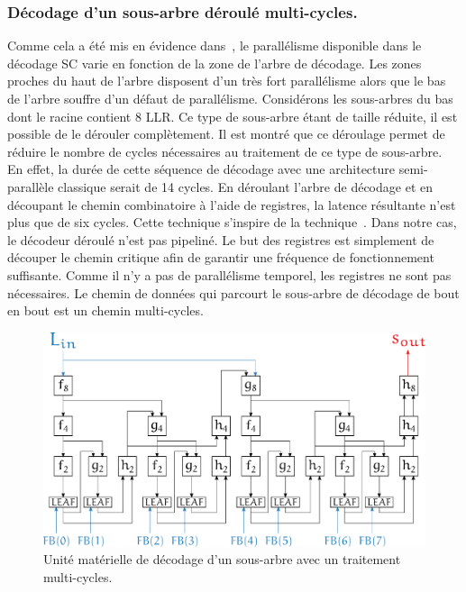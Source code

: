 \subsubsection{Décodage d'un sous-arbre déroulé multi-cycles.}

Comme cela a été mis en évidence dans~\cite{gal_scalable_2016}, le parallélisme disponible dans le décodage SC varie en fonction de la zone de l'arbre de décodage. Les zones proches du haut de l'arbre disposent d'un très fort parallélisme alors que le bas de l'arbre souffre d'un défaut de parallélisme. Considérons les sous-arbres du bas dont le \noeud racine contient 8 LLR. Ce type de sous-arbre étant de taille réduite, il est possible de le dérouler complètement. Il est montré que ce déroulage permet de réduire le nombre de cycles nécessaires au traitement de ce type de sous-arbre. En effet, la durée de cette séquence de décodage avec une architecture semi-parallèle classique serait de 14 cycles. En déroulant l'arbre de décodage et en découpant le chemin combinatoire à l'aide de registres, la latence résultante n'est plus que de six cycles. Cette technique s'inspire de la technique~\cite{giard_unrolled_2015}. Dans notre cas, le décodeur déroulé n'est pas pipeliné. Le but des registres est simplement de découper le chemin critique afin de garantir une fréquence de fonctionnement suffisante. Comme il n'y a pas de parallélisme temporel, les registres ne sont pas nécessaires. Le chemin de données qui parcourt le sous-arbre de décodage de bout en bout est un chemin multi-cycles.

\begin{figure}[htp]
	\centering
	\includegraphics[width=\textwidth]{main/ch4_fig/unrolled_multicycle}
	\caption{Unité matérielle de décodage d'un sous-arbre avec un traitement multi-cycles.}
	\label{fig:unrolled_multicycles}
\end{figure}

